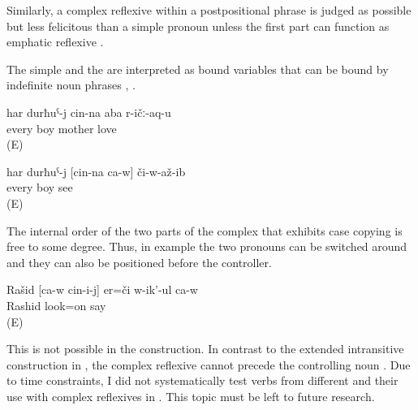 Similarly, a complex reflexive within a postpositional phrase is judged as possible but less felicitous than a simple pronoun unless the first part can function as emphatic reflexive .

The simple and the  are interpreted as bound variables that can be bound by indefinite noun phrases , .
%
\begin{exe}
	\ex	\label{ex:Every boy loves his mother}
	\gll	har	durħuˁ-j	cin-na	aba	r-ičː-aq-u\\
		every	boy		mother	love\\
	\glt	{} (E)

	\ex	\label{ex:Every boy saw himself@25}
	\gll	har	durħuˁ-j	[cin-na	ca-w]	či-w-až-ib\\
		every	boy			see\\
	\glt	{} (E)
\end{exe}


The internal order of the two parts of the complex  that exhibits case copying is free to some degree. Thus, in example  the two pronouns can be switched around and they can also be positioned before the controller.
%
\begin{exe}
	\ex	\label{ex:Rashid is looking at himself}
	\begin{xlist}
		\ex	\label{ex:Rashid is looking at himself@A}
		\gll	Rašid	[ca-w	cin-i-j]	er=či	w-ik'-ul	ca-w\\
			Rashid			look=on	say	\\
		\glt	{} (E)

		\ex	{}	\label{ex:Rashid is looking at himself@B}

		\ex	{}	\label{ex:Rashid is looking at himself@C}
	\end{xlist}
\end{exe}

This is not possible in the  construction. In contrast to the extended intransitive construction in , the complex reflexive cannot precede the controlling noun . Due to time constraints, I did not systematically test verbs from different  and their use with complex reflexives in . This topic must be left to future research. 
%
\begin{exe} 
\end{exe}

